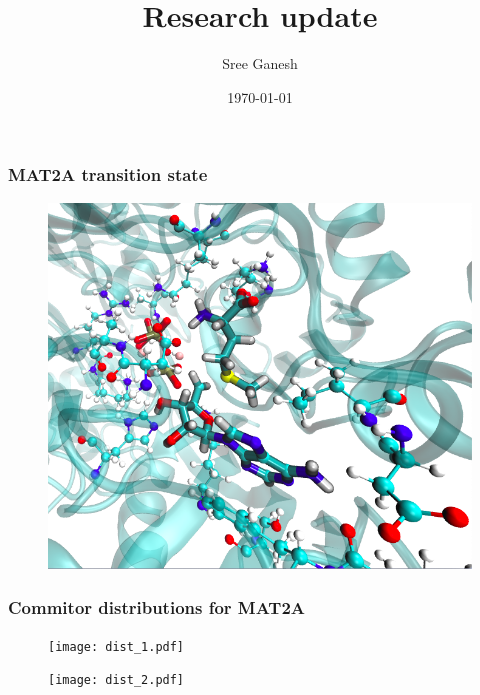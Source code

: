 \documentclass[a4paper,8pt]{beamer}
\title[Comm. analysis]{Research update}
\date{\today}
\author{Sree Ganesh}
\institute[U of A]{Schwartz Group \\ University of Arizona}
\begin{document}
\maketitle
%
%
%
%
\begin{frame}
\frametitle{MAT2A transition state}

\begin{figure}
\includegraphics[scale=0.3]{ts_mat2a.png}
\end{figure}
\end{frame}

\begin{frame}
\frametitle{Commitor distributions for MAT2A}
\begin{figure}
\texttt{[image: dist\_1.pdf]}
\end{figure}
\begin{figure}
\texttt{[image: dist\_2.pdf]}
\end{figure}
\end{frame}
%
\end{document}
